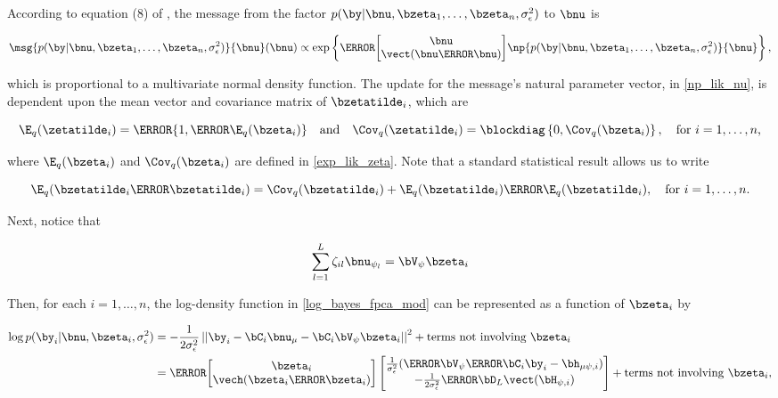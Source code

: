 \documentclass[12pt]{article}
\def\sigsqeps{\sigma^2_{\epsilon}}
\def\numu{\bnu_\mu}
\def\Vpsi{\bV_\psi}
\newcommand\nupsi[1]{\bnu_{\psi_{#1}}}
\newcommand\hmupsi[1]{\bh_{\mu \psi, i}}
\newcommand\Hpsi[1]{\bH_{\psi, i}}
\newcommand\tni[1]{\text{terms not involving $#1$}}
\theoremstyle{plain}
\theoremstyle{definition}
\theoremstyle{remark}
\begin{document}
\noindent According to equation (8) of , the message from the factor $p (\by | \bnu,
\bzeta_1, \dots, \bzeta_n, \sigsqeps)$ to $\bnu$ is 

\[
	\msg{p (\by | \bnu, \bzeta_1, \dots, \bzeta_n, \sigsqeps)}{\bnu} (\bnu) \propto
		\exp \left\{
			\T{\begin{bmatrix}
				\bnu \\
				\vect (\bnu \T{\bnu})
			\end{bmatrix}}
			\np{p (\by | \bnu, \bzeta_1, \dots, \bzeta_n, \sigsqeps)}{\bnu}
		\right\},
\]


\noindent which is proportional to a
multivariate normal density function. The update for the message's natural parameter vector,
in \eqref{np_lik_nu}, is dependent upon
the mean vector and covariance matrix of $\bzetatilde_i$, which are

\begin{equation}
	\E_q (\zetatilde_i) = \T{\{ 1, \T{\E_q (\bzeta_i)} \}} \quad
	\text{and} \quad
	\Cov_q (\zetatilde_i) = \blockdiag \left\{ 0, \Cov_q (\bzeta_i) \right\}, \quad
	\text{for $i = 1, \dots, n$,}
\label{exp_lik_zeta_tilde}
\end{equation}

\noindent where $\E_q (\bzeta_i)$ and $\Cov_q (\bzeta_i)$ are defined in \eqref{exp_lik_zeta}. Note that
a standard statistical result allows us to write

\begin{equation}
	\E_q (\bzetatilde_i \T{\bzetatilde_i}) =
		\Cov_q (\bzetatilde_i) + \E_q (\bzetatilde_i) \T{\E_q (\bzetatilde_i)}, \quad \text{for $i = 1, \dots, n$.}
\label{E_q_outer_zeta}
\end{equation}

Next, notice that

\begin{equation}
	\sum_{l=1}^L \zeta_{il} \nupsi{l} = \Vpsi \bzeta_i
\label{zeta_simplification}
\end{equation}

\noindent Then, for each $i = 1, \dots, n$, the log-density function
in \eqref{log_bayes_fpca_mod} can be represented as a function of $\bzeta_i$ by

\begin{align*}
	\log p (\by_i | \bnu, \bzeta_i, \sigsqeps)
		& = -\frac{1}{2\sigsqeps} \left|\left|
			\by_i - \bC_i \numu - \bC_i \Vpsi \bzeta_i
		\right|\right|^2 + \tni{\bzeta_i} \\
		& = \T{
			\begin{bmatrix}
				\bzeta_i \\
				\vech (\bzeta_i \T{\bzeta_i})
			\end{bmatrix}
		} \begin{bmatrix}
			\frac{1}{\sigsqeps} (\T{\Vpsi} \T{\bC_i} \by_i - \hmupsi{i}) \\
			-\frac{1}{2 \sigsqeps} \T{\bD_L} \vect (\Hpsi{i})
		\end{bmatrix} + \tni{\bzeta_i},
\end{align*}
\end{document}

